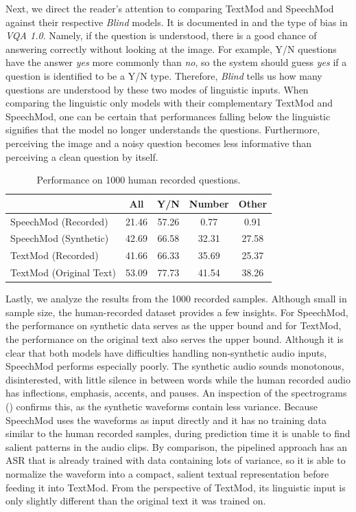 \documentclass[letterpaper]{article} %
\begin{document}
Next, we direct the reader's attention to comparing TextMod and SpeechMod against their respective \textit{Blind} models. It is documented in \cite{VQA} and \cite{VQA2} the type of bias in \textit{VQA 1.0}. Namely, if the question is understood, there is a good chance of answering correctly without looking at the image. For example, Y/N questions have the answer \emph{yes} more commonly than \emph{no}, so the system should guess \emph{yes} if a question is identified to be a Y/N type. Therefore, \textit{Blind} tells us how many questions are understood by these two modes of linguistic inputs. When comparing the linguistic only models with their complementary TextMod and SpeechMod, one can be certain that performances falling below the linguistic signifies that the model no longer understands the questions. Furthermore, perceiving the image and a noisy question becomes less informative than perceiving a clean question by itself.

\begin{table}[t]
\centering
\caption{Performance on 1000 human recorded questions.}
\label{table:recorded}
\begin{tabular}{l|cccc}
                        & All   & Y/N   & Number & Other \\ \hline
SpeechMod (Recorded)    & 21.46 & 57.26 & 0.77   & 0.91  \\
SpeechMod (Synthetic)   & 42.69 & 66.58 & 32.31  & 27.58 \\ \hline
TextMod (Recorded)      & 41.66 & 66.33 & 35.69  & 25.37 \\
TextMod (Original Text) & 53.09 & 77.73 & 41.54  & 38.26
\end{tabular}
\end{table}

Lastly, we analyze the results from the 1000 recorded samples. Although small in sample size, the human-recorded dataset provides a few insights. For SpeechMod, the performance on synthetic data serves as the upper bound and for TextMod, the performance on the original text also serves the upper bound. Although it is clear that both models have difficulties handling non-synthetic audio inputs, SpeechMod performs especially poorly. The synthetic audio sounds monotonous, disinterested, with little silence in between words while the human recorded audio has inflections, emphasis, accents, and pauses. An inspection of the spectrograms () confirms this, as the synthetic waveforms contain less variance. Because SpeechMod uses the waveforms as input directly and it has no training data similar to the human recorded samples, during prediction time it is unable to find salient patterns in the audio clips. By comparison, the pipelined approach has an ASR that is already trained with data containing lots of variance, so it is able to normalize the waveform into a compact, salient textual representation before feeding it into TextMod. From the perspective of TextMod, its linguistic input is only slightly different than the original text it was trained on.
\end{document}
